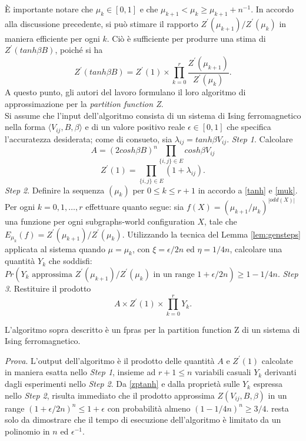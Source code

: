 È importante notare che $\mu_k \in [0,1]$ e che $\mu_{k+1} < \mu_k \geq \mu_{k+1} + n^{-1}$. In accordo alla discussione precedente, si può stimare il rapporto $Z^{\prime}(\mu_{k+1})/Z^{\prime}(\mu_k)$ in maniera efficiente per ogni $k$. Ciò è sufficiente per produrre una stima di $Z^{\prime}(tanh\beta B)$, poiché si ha
\begin{equation}
	Z^{\prime}(tanh\beta B) = Z^{\prime}(1) \times \prod_{k=0}^{r}{\frac{Z^{\prime}(\mu_{k+1})}{Z^{\prime}(\mu_k)}}.
	\label{zptanh}
\end{equation}
A questo punto, gli autori del lavoro formulano il loro algoritmo di approssimazione per la \textit{partition function Z}.\\
Si assume che l'input dell'algoritmo consista di un sistema di Ising ferromagnetico nella forma $\langle V_{ij}, B, \beta\rangle$ e di un valore positivo reale $\epsilon \in [0,1]$ che specifica l'accuratezza desiderata; come di consueto, sia $\lambda_{ij} = tanh\beta V_{ij}$.
\textit{Step 1}. Calcolare
\begin{equation}
	A = (2cosh\beta B)^{n}\prod_{\{i,j\}\in E}{cosh\beta V_{ij}}
\end{equation}
\begin{equation}
	Z^{\prime}(1) = \prod_{\{i,j\} \in E}{(1 + \lambda_{ij})}.
\end{equation}
\textit{Step 2}. Definire la sequenza $(\mu_k)$ per $0 \leq k \leq r + 1$ in accordo a \ref{tanh} e \ref{muk}. Per ogni $k = 0, 1, \dots, r$ effettuare quanto segue:
sia $f(X) = (\mu_{k+1}/\mu_k)^{|odd(X)|}$ una funzione per ogni subgraphs-world configuration $X$, tale che $E_{\mu_k}(f) = Z^{\prime}(\mu_{k+1})/Z^{\prime}(\mu_k)$.
Utilizzando la tecnica del Lemma \ref{lem:gensteps} applicata al sistema quando $\mu = \mu_k$, con $\xi = \epsilon/2n$ ed $\eta = 1/4n$, calcolare una quantità $Y_k$ che soddisfi:
$Pr(Y_k\text{ approssima } Z^{\prime}(\mu_{k+1})/Z^{\prime}(\mu_k)\text{ in un range } 1 + \epsilon/2n) \geq 1 - 1/4n$.
\textit{Step 3}. Restituire il prodotto
\begin{equation}
	A \times Z^{\prime}(1) \times \prod_{k=0}^{r}{Y_k}.
	\label{azy}
\end{equation}
\begin{thm}
	L'algoritmo sopra descritto è un fpras per la partition function Z di un sistema di Ising ferromagnetico.
	\label{thm:fpras}
\end{thm}
\textit{Prova}. L'output dell'algoritmo è il prodotto delle quantità $A$ e $Z^{\prime}(1)$ calcolate in maniera esatta nello \textit{Step 1}, insieme ad $r + 1 \leq n$ variabili casuali $Y_k$ derivanti dagli esperimenti nello \textit{Step 2}. Da \ref{zptanh} e dalla proprietà sulle $Y_k$ espressa nello \textit{Step 2}, risulta immediato che il prodotto approssima $Z(V_{ij}, B, \beta)$ in un range $(1 + \epsilon/2n)^n \leq 1 + \epsilon$ con probabilità almeno $(1 - 1/4n)^n \geq 3/4$. resta solo da dimostrare che il tempo di esecuzione dell'algoritmo è limitato da un polinomio in $n$ ed $\epsilon^{-1}$.\\
